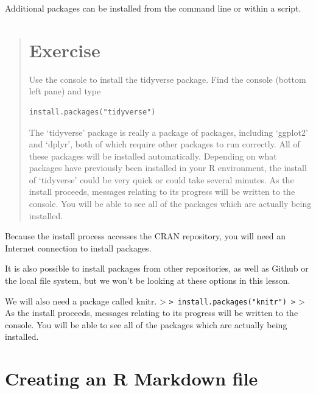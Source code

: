 \documentclass[]{book}
\begin{document}
Additional packages can be installed from the command line or within a
script.

\begin{quote}
\section{Exercise}\label{exercise}

Use the console to install the tidyverse package. Find the console
(bottom left pane) and type

\begin{verbatim}
install.packages("tidyverse")
\end{verbatim}

The `tidyverse' package is really a package of packages, including
`ggplot2' and `dplyr', both of which require other packages to run
correctly. All of these packages will be installed automatically.
Depending on what packages have previously been installed in your R
environment, the install of `tidyverse' could be very quick or could
take several minutes. As the install proceeds, messages relating to its
progress will be written to the console. You will be able to see all of
the packages which are actually being installed.
\end{quote}

Because the install process accesses the CRAN repository, you will need
an Internet connection to install packages.

It is also possible to install packages from other repositories, as well
as Github or the local file system, but we won't be looking at these
options in this lesson.

We will also need a package called knitr. \textgreater{}
\texttt{\textgreater{}\ install.packages("knitr")\ \textgreater{}}
\textgreater{} As the install proceeds, messages relating to its
progress will be written to the console. You will be able to see all of
the packages which are actually being installed.

\section{Creating an R Markdown file}\label{creating-an-r-markdown-file}
\end{document}
